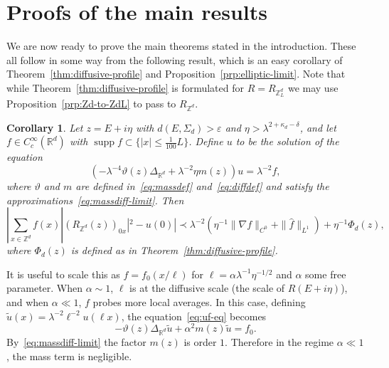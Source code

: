 \documentclass[11pt]{amsart}
\def\Real{{\mathbb R}}
\def\bbZ{{\mathbb Z}}
\def\Z{{\mathbb{Z}}}
\def\eps{{\varepsilon}}
\newcommand{\Ft}[1]{{\widehat{#1}}}
\newcommand{\supp}{\operatorname*{supp}}
\newcommand{\ldom}{\prec}
\numberwithin{equation}{section}
\numberwithin{theorem}{section}
\newtheorem{corollary}[theorem]{Corollary}
\begin{document}
\section{Proofs of the main results}
\label{sec:proofs}
We are now ready to prove the main theorems stated in the introduction.  These all follow in some way
from the following result, which is an easy corollary of Theorem~\ref{thm:diffusive-profile} and Proposition~\ref{prp:elliptic-limit}. Note that while Theorem~\ref{thm:diffusive-profile} is formulated for $R=R_{\bbZ^d_L}$ we may use Proposition~\ref{prp:Zd-to-ZdL} to pass to $R_{\bbZ^d}$.
\begin{corollary}
\label{cor:main-cor}
Let $z=E+i\eta$ with $d(E,\Sigma_d)>\eps$ and $\eta > \lambda^{2+\kappa_d-\delta}$,
and let $f\in C_c^\infty(\Real^d)$ with $\supp f\subset \{|x|\leq \frac{1}{100}L\}$.  Define $u$ to be the solution of the equation
\begin{equation}
\label{eq:uf-eq}
(-\lambda^{-4}\vartheta(z) \Delta_{\Real^d} + \lambda^{-2}\eta m(z))u = \lambda^{-2}f,
\end{equation}
where $\vartheta$ and $m$ are defined in~\eqref{eq:massdef} and~\eqref{eq:diffdef}
and satisfy the approximations~\eqref{eq:massdiff-limit}.  Then
\begin{equation}
\label{eq:combined-compare}
|\sum_{x\in\Z^d} f(x) |(R_{\bbZ^d}(z))_{0x}|^2  - u(0)| \ldom
\lambda^{-2} ( \eta^{-1}\|\nabla  f\|_{C^0} + \|\Ft{f}\|_{L^1}) + \eta^{-1} \Phi_d(z),
\end{equation}
where $\Phi_d(z)$ is defined as in Theorem~\ref{thm:diffusive-profile}.
\end{corollary}

It is useful to scale this as $f=f_0(x/\ell)$ for
$\ell = \alpha \lambda^{-1}\eta^{-1/2}$ and $\alpha$ some free parameter.  When $\alpha\sim 1$,
$\ell$ is at the diffusive scale (the scale of $R(E+i\eta)$),
and when $\alpha\ll 1$, $f$ probes more local averages.
In this case, defining
$\tilde{u}(x) = \lambda^{-2}\ell^{-2} u(\ell x)$, the equation~\eqref{eq:uf-eq} becomes
\begin{equation}
\label{eq:rescaled-elliptic}
-\vartheta(z) \Delta_{\Real^d} \tilde{u} + \alpha^2 m(z)\tilde{u} = f_0.
\end{equation}
By~\eqref{eq:massdiff-limit} the factor $m(z)$ is order $1$.  Therefore in the regime
$\alpha \ll 1$, the mass term is negligible.
\end{document}
